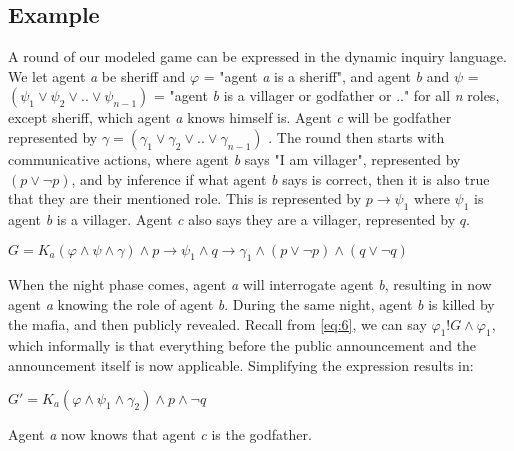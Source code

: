 \subsection{Example}
A round of our modeled game can be expressed in the dynamic inquiry language. We let agent \textit{a} be sheriff and $\varphi$ = "agent \textit{a} is a sheriff", and agent \textit{b} and $\psi$ = $(\psi_1 \lor \psi_2 \lor .. \lor \psi_{n-1})$ = "agent \textit{b} is a villager or godfather or .." for all \textit{n} roles, except sheriff, which agent \textit{a} knows himself is. Agent \textit{c} will be godfather represented by $\gamma = (\gamma_1 \lor \gamma_2 \lor .. \lor \gamma_{n-1}) $ . The round then starts with communicative actions, where agent \textit{b} says "I am villager", represented by $(p \lor \neg p)$, and by inference if what agent \textit{b} says is correct, then it is also true that they are their mentioned role. This is represented by $p \rightarrow \psi_1$ where $\psi_1$ is agent \textit{b} is a villager. Agent \textit{c} also says they are a villager, represented by $q$.

$G = K_a(\varphi \land \psi \land\gamma)\land p \rightarrow \psi_1 \land q \rightarrow \gamma_1 \land (p \lor \neg p) \land (q \lor \neg q)$ \label{eq:7}

When the night phase comes, agent \textit{a} will interrogate agent \textit{b}, resulting in now agent \textit{a} knowing the role of agent \textit{b}. During the same night, agent \textit{b} is killed by the mafia, and then publicly revealed. Recall from \cref{eq:6}, we can say $\varphi_1!G\land\varphi_1$, which informally is that everything before the public announcement and the announcement itself is now applicable. Simplifying the expression results in:

$G' = K_a(\varphi \land \psi_1 \land \gamma_2) \land p \land \neg q$

Agent \textit{a} now knows that agent \textit{c} is the godfather.